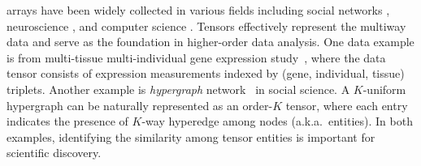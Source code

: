 \documentclass[lettersize,onecolumn,journal]{IEEEtran}
\theoremstyle{definition}
\theoremstyle{definition}
\def\fixme#1#2{\textbf{\color{red}[FIXME (#1): #2]}}
\providecommand{\DIFdelbegin}{} %
\providecommand{\DIFdelend}{} %
\newcommand{\DIFscaledelfig}{0.5}
\newlength{\DIFdelgraphicswidth} %
\newlength{\DIFdelgraphicsheight} %
\newcommand{\DIFdelincludegraphics}[2][]{%
\sbox{\DIFdelgraphicsbox}{\DIFOincludegraphics[#1]{#2}}%
\settoboxwidth{\DIFdelgraphicswidth}{\DIFdelgraphicsbox} %
\settoboxtotalheight{\DIFdelgraphicsheight}{\DIFdelgraphicsbox} %
\scalebox{\DIFscaledelfig}{%
\parbox[b]{\DIFdelgraphicswidth}{\usebox{\DIFdelgraphicsbox}\\[-\baselineskip] \rule{\DIFdelgraphicswidth}{0em}}\llap{\resizebox{\DIFdelgraphicswidth}{\DIFdelgraphicsheight}{%
\setlength{\unitlength}{\DIFdelgraphicswidth}%
\begin{picture}(1,1)%
\thicklines\linethickness{2pt} %
{\color[rgb]{1,0,0}\put(0,0){\framebox(1,1){}}}%
{\color[rgb]{1,0,0}\put(0,0){\line( 1,1){1}}}%
{\color[rgb]{1,0,0}\put(0,1){\line(1,-1){1}}}%
\end{picture}%
}\hspace*{3pt}}} %
} %
\DeclareRobustCommand{\DIFdelbegin}{\DIFOdelbegin \let\includegraphics\DIFdelincludegraphics} %
\DeclareRobustCommand{\DIFdelend}{\DIFOaddend \let\includegraphics\DIFOincludegraphics} %
\begin{document}

\DIFdelend {} arrays have been widely collected in various fields including social networks \citep{anandkumar2014tensor}, neuroscience \citep{wang2017bayesian}, and computer science \citep{koniusz2016sparse}. Tensors effectively represent the multiway data and serve as the foundation in higher-order data analysis. One data example is from multi-tissue multi-individual gene expression study~\citep{wang2019three,hore2016tensor}, where the data tensor consists of expression measurements indexed by (gene, individual, tissue) triplets. Another example is \emph{hypergraph} network~\citep{ghoshdastidar2017uniform,ghoshdastidar2017consistency,ahn2019community,ke2019community} in social science. A $K$-uniform hypergraph can be naturally represented as an order-$K$ tensor, where each entry indicates the presence of $K$-way hyperedge among nodes (a.k.a.\ entities). In both examples, identifying the similarity among tensor entities is important for scientific discovery. 


\DIFdelbegin %
\end{document}
